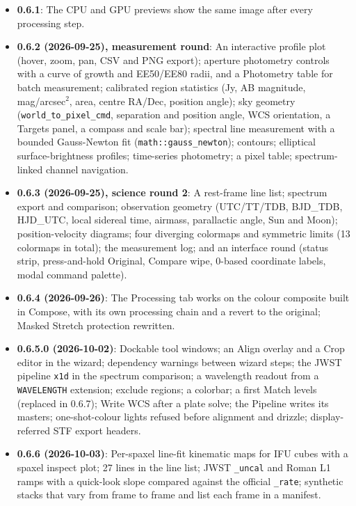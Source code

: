 \documentclass[11pt,a4paper]{article}
\newcommand{\code}[1]{\texttt{\small #1}}
\begin{document}
    \begin{itemize}[nosep]
    \item \textbf{0.6.1}: The CPU and GPU previews show the same image after every processing step.
    \item \textbf{0.6.2 (2026-09-25), measurement round}: An interactive profile plot (hover, zoom, pan, CSV and PNG export); aperture photometry controls with a curve of growth and EE50/EE80 radii, and a Photometry table for batch measurement; calibrated region statistics (Jy, AB magnitude, mag/arcsec$^2$, area, centre RA/Dec, position angle); sky geometry (\code{world\_to\_pixel\_cmd}, separation and position angle, WCS orientation, a Targets panel, a compass and scale bar); spectral line measurement with a bounded Gauss-Newton fit (\code{math::gauss\_newton}); contours; elliptical surface-brightness profiles; time-series photometry; a pixel table; spectrum-linked channel navigation.
    \item \textbf{0.6.3 (2026-09-25), science round 2}: A rest-frame line list; spectrum export and comparison; observation geometry (UTC/TT/TDB, BJD\_TDB, HJD\_UTC, local sidereal time, airmass, parallactic angle, Sun and Moon); position-velocity diagrams; four diverging colormaps and symmetric limits (13 colormaps in total); the measurement log; and an interface round (status strip, press-and-hold Original, Compare wipe, 0-based coordinate labels, modal command palette).
    \item \textbf{0.6.4 (2026-09-26)}: The Processing tab works on the colour composite built in Compose, with its own processing chain and a revert to the original; Masked Stretch protection rewritten.
    \item \textbf{0.6.5.0 (2026-10-02)}: Dockable tool windows; an Align overlay and a Crop editor in the wizard; dependency warnings between wizard steps; the JWST pipeline \code{x1d} in the spectrum comparison; a wavelength readout from a \code{WAVELENGTH} extension; exclude regions; a colorbar; a first Match levels (replaced in 0.6.7); Write WCS after a plate solve; the Pipeline writes its masters; one-shot-colour lights refused before alignment and drizzle; display-referred STF export headers.
    \item \textbf{0.6.6 (2026-10-03)}: Per-spaxel line-fit kinematic maps for IFU cubes with a spaxel inspect plot; 27 lines in the line list; JWST \code{\_uncal} and Roman L1 ramps with a quick-look slope compared against the official \code{\_rate}; synthetic stacks that vary from frame to frame and list each frame in a manifest.

\end{itemize}
\end{document}
